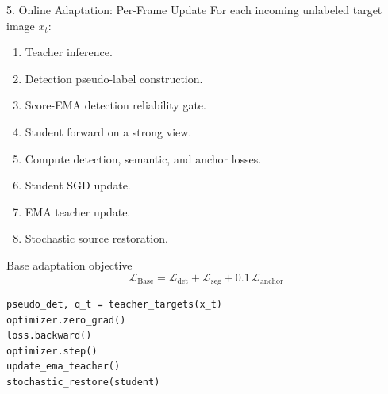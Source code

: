 \documentclass[aspectratio=169,11pt]{beamer}
\begin{document}
\begin{frame}[fragile]{5. Online Adaptation: Per-Frame Update}
For each incoming unlabeled target image $x_t$:

\begin{enumerate}
  \item Teacher inference.
  \item Detection pseudo-label construction.
  \item Score-EMA detection reliability gate.
  \item Student forward on a strong view.
  \item Compute detection, semantic, and anchor losses.
  \item Student SGD update.
  \item EMA teacher update.
  \item Stochastic source restoration.
\end{enumerate}

\begin{block}{Base adaptation objective}
\[
\mathcal{L}_{\mathrm{Base}}
=
\mathcal{L}_{\mathrm{det}}
+
\mathcal{L}_{\mathrm{seg}}
+
0.1\,\mathcal{L}_{\mathrm{anchor}}
\]
\end{block}

\begin{lstlisting}[basicstyle=\ttfamily\tiny,aboveskip=2pt,belowskip=0pt]
pseudo_det, q_t = teacher_targets(x_t)
optimizer.zero_grad()
loss.backward()
optimizer.step()
update_ema_teacher()
stochastic_restore(student)
\end{lstlisting}

\end{frame}
\end{document}
